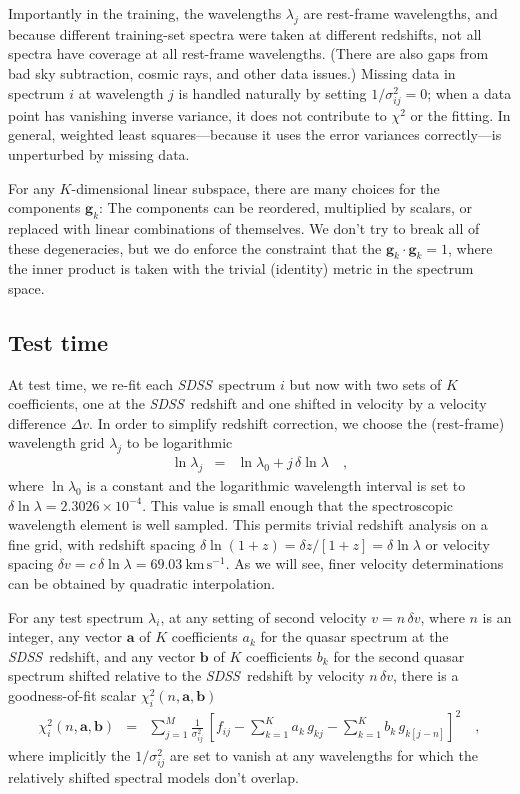 \documentclass[preprint]{aastex}
\newcommand{\project}[1]{\textsl{#1}}
\newcommand{\SDSS}{\project{SDSS}}
\newcommand{\unit}[1]{\mathrm{#1}}
\newcommand{\km}{\unit{km}}
\newcommand{\s}{\unit{s}}
\newcommand{\kmps}{\km\,\s^{-1}}
\newcommand{\mmatrix}[1]{\boldsymbol{#1}}
\newcommand{\avec}{\mmatrix{a}}
\newcommand{\bvec}{\mmatrix{b}}
\newcommand{\gvec}{\mmatrix{g}}
\begin{document}
Importantly in the training, the wavelengths $\lambda_j$ are
rest-frame wavelengths, and because different training-set spectra
were taken at different redshifts, not all spectra have coverage at
all rest-frame wavelengths.  (There are also gaps from bad sky
subtraction, cosmic rays, and other data issues.)  Missing data in
spectrum $i$ at wavelength $j$ is handled naturally by setting
$1/\sigma^2_{ij}=0$; when a data point has vanishing inverse
variance, it does not contribute to $\chi^2$ or the fitting.  In
general, weighted least squares---because it uses the error variances
correctly---is unperturbed by missing data.

For any $K$-dimensional linear subspace, there are many choices for
the components $\gvec_k$: The components can be reordered, multiplied
by scalars, or replaced with linear combinations of themselves.  We
don't try to break all of these degeneracies, but we do enforce the
constraint that the $\gvec_k\cdot\gvec_k=1$, where the inner product
is taken with the trivial (identity) metric in the spectrum space.

\subsection{Test time}

At test time, we re-fit each \SDSS\ spectrum $i$ but now with two sets
of $K$ coefficients, one at the \SDSS\ redshift and one shifted in
velocity by a velocity difference $\Delta v$.  In order to simplify
redshift correction, we choose the (rest-frame) wavelength grid
$\lambda_j$ to be logarithmic
\begin{eqnarray}\displaystyle
\ln\lambda_j &=& \ln\lambda_0 + j\,\delta\ln\lambda
\quad ,
\end{eqnarray}
where $\ln\lambda_0$ is a constant and the logarithmic wavelength
interval is set to $\delta\ln\lambda=2.3026\times 10^{-4}$.  This
value is small enough that the spectroscopic wavelength element is
well sampled.  This permits trivial redshift analysis on a fine grid,
with redshift spacing $\delta\ln(1+z)=\delta z/[1+z]=\delta\ln\lambda$
or velocity spacing $\delta v=c\,\delta\ln\lambda=69.03~\kmps$.  As we
will see, finer velocity determinations can be obtained by quadratic
interpolation.

For any test spectrum $\lambda_i$, at any setting of second velocity
$v= n\,\delta v$, where $n$ is an integer, any vector $\avec$ of $K$
coefficients $a_k$ for the quasar spectrum at the \SDSS\ redshift, and
any vector $\bvec$ of $K$ coefficients $b_k$ for the second quasar
spectrum shifted relative to the \SDSS\ redshift by velocity
$n\,\delta v$, there is a goodness-of-fit scalar
$\chi^2_i(n,\avec,\bvec)$
\begin{eqnarray}\displaystyle
\chi^2_i(n,\avec,\bvec) &=& \sum_{j=1}^{M} \frac{1}{\sigma^2_{ij}}
 \,\left[f_{ij} - \sum_{k=1}^K a_k\,g_{kj} - \sum_{k=1}^K b_k\,g_{k[j-n]}\right]^2
\quad,
\end{eqnarray}
where implicitly the $1/\sigma^2_{ij}$ are set to vanish at any
wavelengths for which the relatively shifted spectral models don't
overlap.
\end{document}
